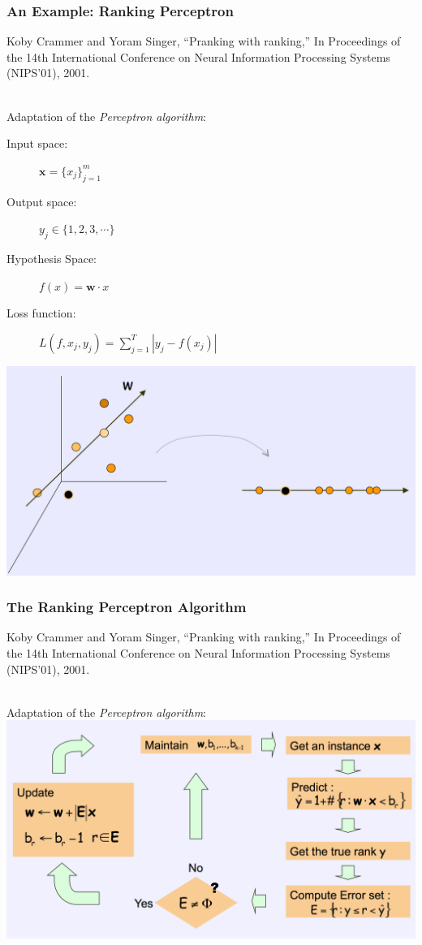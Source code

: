 \documentclass{beamer}
\begin{document}
\begin{frame}
    \frametitle{An Example: Ranking Perceptron}
    \begin{minipage}{1.0\linewidth}
        \footnotesize Koby Crammer and Yoram Singer, ``Pranking with ranking,''
        In Proceedings of the 14th International Conference on Neural
        Information Processing Systems (NIPS'01), 2001.
    \end{minipage}\\[\baselineskip]

    Adaptation of the \textit{Perceptron algorithm}:
    \vfill
    \begin{description}
    \item[Input space:] $\mathbf{x} = \{x_j\}_{j=1}^m$
    \item[Output space:] $y_j \in \{1, 2, 3, \cdots \}$
    \item[Hypothesis Space:] $f(x) = \mathbf{w} \cdot x$
    \item[Loss function:] $L(f, x_j, y_j) = \sum_{j=1}^T|y_j - f(x_j)|$
    \end{description}
    \vfill
    \centering
    \includegraphics[width=.7\linewidth]{pranking}
\end{frame}
\begin{frame}
    \frametitle{The Ranking Perceptron Algorithm}
    \begin{minipage}{1.0\linewidth}
        \footnotesize Koby Crammer and Yoram Singer, ``Pranking with ranking,''
        In Proceedings of the 14th International Conference on Neural
        Information Processing Systems (NIPS'01), 2001.
    \end{minipage}\\[\baselineskip]
    Adaptation of the \textit{Perceptron algorithm}:
    \vfill
    \centering
    \includegraphics[width=.8\linewidth]{pranking2}
\end{frame}
\end{document}
